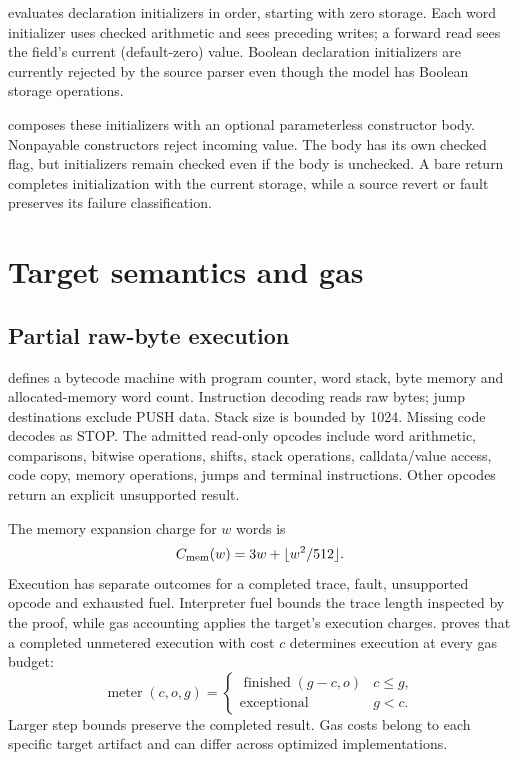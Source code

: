 \documentclass[conference]{IEEEtran}
\begin{document}
 evaluates declaration initializers
in order, starting with zero storage. Each word initializer uses checked
arithmetic and sees preceding writes; a forward read sees the field's current
(default-zero) value. Boolean declaration initializers are currently rejected
by the source parser even though the model has Boolean storage operations.

 composes these initializers with an
optional parameterless constructor body. Nonpayable constructors reject
incoming value. The body has its own checked flag, but initializers remain
checked even if the body is unchecked. A bare return completes initialization
with the current storage, while a source revert or fault preserves its failure
classification.

\section{Target semantics and gas}
\subsection{Partial raw-byte execution}
 defines a bytecode machine with program counter,
word stack, byte memory and allocated-memory word count. Instruction decoding
reads raw bytes; jump destinations exclude PUSH data. Stack size is bounded
by 1024. Missing code decodes as STOP. The admitted read-only opcodes include
word arithmetic, comparisons, bitwise operations, shifts, stack operations,
calldata/value access, code copy, memory operations, jumps and terminal
instructions. Other opcodes return an explicit unsupported result.

The memory expansion charge for $w$ words is
\[
 C_{\rm mem}(w)=3w+\lfloor w^2/512\rfloor.
\]
Execution has separate outcomes for a completed trace, fault, unsupported
opcode and exhausted fuel. Interpreter fuel bounds the trace length inspected
by the proof, while gas accounting applies the target's execution charges.
 proves that a completed unmetered execution
with cost $c$ determines execution at every gas budget:
\[
 \operatorname{meter}(c,o,g)=
 \begin{cases}\operatorname{finished}(g-c,o)&c\leq g,\\
 \operatorname{exceptional}&g<c.
 \end{cases}
\]
Larger step bounds preserve the completed result. Gas costs belong to each
specific target artifact and can differ across optimized implementations.
\end{document}
